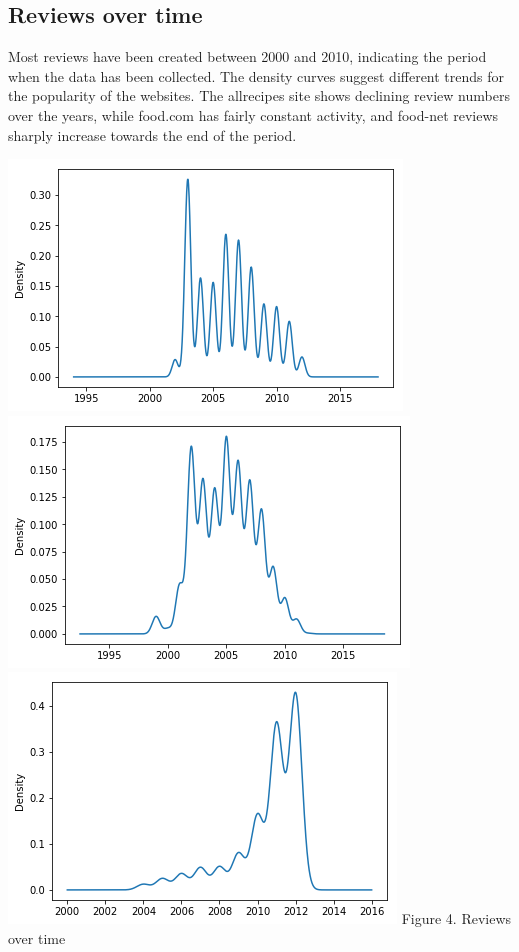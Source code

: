 \documentclass[11pt]{article}
\begin{document}
\subsection{Reviews over time}

Most reviews have been created between 2000 and 2010, indicating the period when the data has been collected. The density curves suggest different trends for the popularity of the websites. The allrecipes site shows declining review numbers over the years, while food.com has fairly constant activity, and food-net reviews sharply increase towards the end of the period.

\vspace{5mm}
\begin{center}
\includegraphics[scale=0.17]{time-1}
\includegraphics[scale=0.17]{time-2}
\includegraphics[scale=0.17]{time-3}
\label{visalization-time} Figure 4. Reviews over time
\end{center}
\vspace{5mm}
\end{document}
